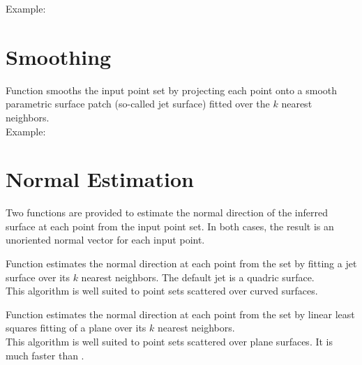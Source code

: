 Example:



\section{Smoothing}

Function  smooths the input point set by projecting each point onto a smooth parametric surface patch (so-called jet surface) fitted over the $k$ nearest neighbors. \\


Example:



\section{Normal Estimation}

Two functions are provided to estimate the normal direction of the inferred surface at each point from the input point set. In both cases, the result is an unoriented normal vector for each input point.

Function  estimates the normal direction at each point from the set by fitting a jet surface over its $k$ nearest neighbors. The default jet is a quadric surface.\\
This algorithm is well suited to point sets scattered over curved surfaces.

Function  estimates the normal direction at each point from the set by linear least squares fitting of a plane over its $k$ nearest neighbors.\\
This algorithm is well suited to point sets scattered over plane surfaces. It is much faster than .

